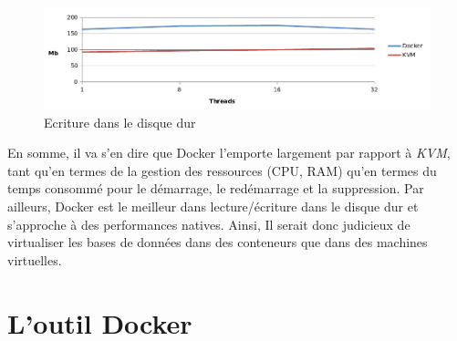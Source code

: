 \begin{onehalfspace}
\begin{figure}[H]
\centering
\includegraphics [width=160mm]{chapitre2/assets/file-io-write.png}
\caption{Ecriture dans le disque dur}
\label{fig:}
\end{figure}


En somme, il va s'en dire que Docker l'emporte largement par rapport à \emph{KVM}, tant qu'en termes de la gestion des ressources (CPU, RAM) qu'en termes du temps consommé pour le démarrage, le redémarrage et la suppression. Par ailleurs, Docker est le meilleur dans lecture/écriture dans le disque dur et s'approche à des performances natives. Ainsi, Il serait donc judicieux de virtualiser les bases de données dans des conteneurs que dans des machines virtuelles. 







\section{L'outil Docker}

\end{onehalfspace}
